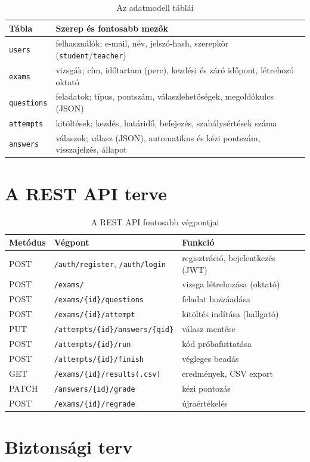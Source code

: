 \begin{table}[H]
  \centering
  \caption{Az adatmodell táblái}
  \label{tab:adatmodell}
  \begin{tabularx}{\textwidth}{@{}lX@{}}
    \toprule
    Tábla & Szerep és fontosabb mezők \\
    \midrule
    \texttt{users}     & felhasználók; e-mail, név, jelszó-hash, szerepkör (\texttt{student}/\texttt{teacher}) \\
    \texttt{exams}     & vizsgák; cím, időtartam (perc), kezdési és záró időpont, létrehozó oktató \\
    \texttt{questions} & feladatok; típus, pontszám, válaszlehetőségek, megoldókulcs (JSON) \\
    \texttt{attempts}  & kitöltések; kezdés, határidő, befejezés, szabálysértések száma \\
    \texttt{answers}   & válaszok; válasz (JSON), automatikus és kézi pontszám, visszajelzés, állapot \\
    \bottomrule
  \end{tabularx}
\end{table}

\section{A REST API terve}
\begin{table}[H]
  \centering
  \caption{A REST API fontosabb végpontjai}
  \label{tab:api}
  \small
  \begin{tabularx}{\textwidth}{@{}lp{6.2cm}X@{}}
    \toprule
    Metódus & Végpont & Funkció \\
    \midrule
    POST   & \texttt{/auth/register}, \texttt{/auth/login} & regisztráció, bejelentkezés (JWT) \\
    POST   & \texttt{/exams/} & vizsga létrehozása (oktató) \\
    POST   & \texttt{/exams/\{id\}/questions} & feladat hozzáadása \\
    POST   & \texttt{/exams/\{id\}/attempt} & kitöltés indítása (hallgató) \\
    PUT    & \texttt{/attempts/\{id\}/answers/\{qid\}} & válasz mentése \\
    POST   & \texttt{/attempts/\{id\}/run} & kód próbafuttatása \\
    POST   & \texttt{/attempts/\{id\}/finish} & végleges beadás \\
    GET    & \texttt{/exams/\{id\}/results(.csv)} & eredmények, CSV export \\
    PATCH  & \texttt{/answers/\{id\}/grade} & kézi pontozás \\
    POST   & \texttt{/exams/\{id\}/regrade} & újraértékelés \\
    \bottomrule
  \end{tabularx}
\end{table}

\section{Biztonsági terv}
